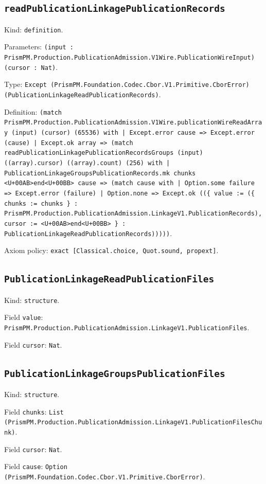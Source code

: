 \documentclass[11pt]{article}
\begin{document}
\subsection*{\texttt{readPublicationLinkagePublicationRecords}}
\noindent Kind: \texttt{definition}.\par
\noindent Parameters: \texttt{(input : PrismPM.Production.PublicationAdmission.V1Wire.PublicationWireInput) (cursor : Nat)}.\par
\noindent Type: \texttt{Except (PrismPM.Foundation.Codec.Cbor.V1.Primitive.CborError) (PublicationLinkageReadPublicationRecords)}.\par
\noindent Definition: \texttt{(match PrismPM.Production.PublicationAdmission.V1Wire.publicationWireReadArray (input) (cursor) (65536) with | Except.error cause => Except.error (cause) | Except.ok array => (match readPublicationLinkagePublicationRecordsGroups (input) ((array).cursor) ((array).count) (256) with | PublicationLinkageGroupsPublicationRecords.mk chunks <U+00AB>end<U+00BB> cause => (match cause with | Option.some failure => Except.error (failure) | Option.none => Except.ok ((\{ value := (\{ chunks := chunks \} : PrismPM.Production.PublicationAdmission.LinkageV1.PublicationRecords), cursor := <U+00AB>end<U+00BB> \} : PublicationLinkageReadPublicationRecords)))))}.\par
\noindent Axiom policy: \texttt{exact [Classical.choice, Quot.sound, propext]}.\par
\subsection*{\texttt{PublicationLinkageReadPublicationFiles}}
\noindent Kind: \texttt{structure}.\par
\noindent Field \texttt{value}: \texttt{PrismPM.Production.PublicationAdmission.LinkageV1.PublicationFiles}.\par
\noindent Field \texttt{cursor}: \texttt{Nat}.\par
\subsection*{\texttt{PublicationLinkageGroupsPublicationFiles}}
\noindent Kind: \texttt{structure}.\par
\noindent Field \texttt{chunks}: \texttt{List (PrismPM.Production.PublicationAdmission.LinkageV1.PublicationFilesChunk)}.\par
\noindent Field \texttt{cursor}: \texttt{Nat}.\par
\noindent Field \texttt{cause}: \texttt{Option (PrismPM.Foundation.Codec.Cbor.V1.Primitive.CborError)}.\par
\end{document}
